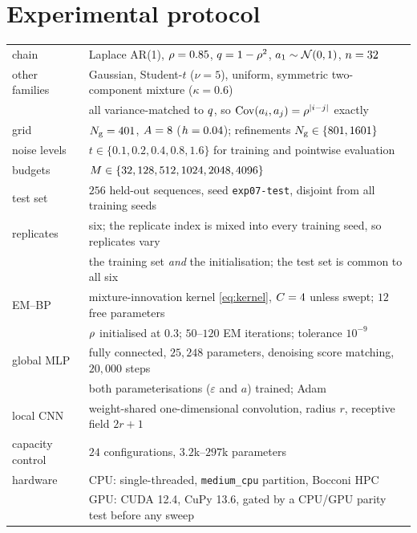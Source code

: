 \section{Experimental protocol}
\label{app:protocol}

\begin{center}
\small
\begin{tabular}{ll}
\toprule
chain & Laplace AR(1), $\rho=0.85$, $q=1-\rho^2$, $a_1\sim\mathcal{N}\!\left(0,1\right)$, $n=32$ \\
other families & Gaussian, Student-$t$ ($\nu=5$), uniform, symmetric two-component mixture
                 ($\kappa=0.6$) \\
                & all variance-matched to $q$, so $\operatorname{Cov}(a_i,a_j)=\rho^{|i-j|}$ exactly \\
grid & $N_{\mathrm{g}}=401$, $A=8$ ($h=0.04$); refinements $N_{\mathrm{g}}\in\{801,1601\}$ \\
noise levels & $t\in\{0.1,0.2,0.4,0.8,1.6\}$ for training and pointwise evaluation \\
budgets & $M\in\{32,128,512,1024,2048,4096\}$ \\
test set & $256$ held-out sequences, seed \texttt{exp07-test}, disjoint from all training seeds \\
replicates & six; the replicate index is mixed into every training seed, so replicates vary \\
           & the training set \emph{and} the initialisation; the test set is common to all six \\
\midrule
EM--BP & mixture-innovation kernel \eqref{eq:kernel}, $C=4$ unless swept;
         $12$ free parameters \\
       & $\rho$ initialised at $0.3$; $50$--$120$ EM iterations; tolerance $10^{-9}$ \\
global MLP & fully connected, $25{,}248$ parameters, denoising score matching, $20{,}000$
             steps \\
           & both parameterisations ($\varepsilon$ and $a$) trained; Adam \\
local CNN & weight-shared one-dimensional convolution, radius $r$, receptive field $2r+1$ \\
capacity control & $24$ configurations, $3.2$k--$297$k parameters \\
\midrule
hardware & CPU: single-threaded, \texttt{medium\_cpu} partition, Bocconi HPC \\
         & GPU: CUDA 12.4, CuPy 13.6, gated by a CPU/GPU parity test before any sweep \\
\bottomrule
\end{tabular}
\end{center}

